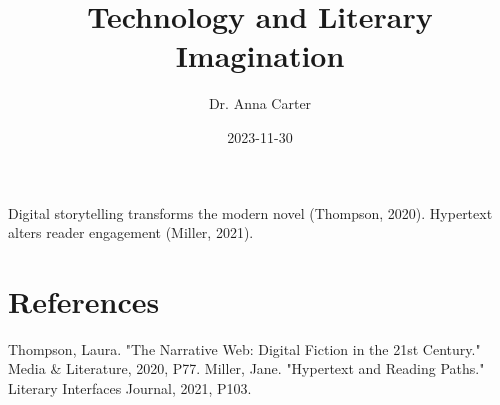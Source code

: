 \documentclass{article}
\title{Technology and Literary Imagination}
\author{Dr. Anna Carter}
\date{2023-11-30}
\begin{document}
\maketitle
Digital storytelling transforms the modern novel (Thompson, 2020). Hypertext alters reader engagement (Miller, 2021).

\section{References}
Thompson, Laura. "The Narrative Web: Digital Fiction in the 21st Century." Media \& Literature, 2020, P77.
Miller, Jane. "Hypertext and Reading Paths." Literary Interfaces Journal, 2021, P103.
\end{document}
